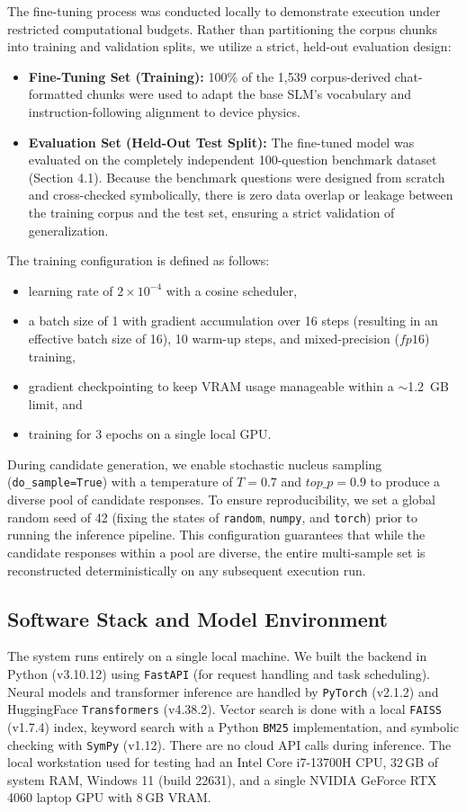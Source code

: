 \documentclass[a4paper,fleqn]{cas-sc}
\begin{document}
The fine-tuning process was conducted locally to demonstrate execution under restricted computational budgets. Rather than partitioning the corpus chunks into training and validation splits, we utilize a strict, held-out evaluation design:
\begin{itemize}
    \item \textbf{Fine-Tuning Set (Training):} 100\% of the 1,539 corpus-derived chat-formatted chunks were used to adapt the base SLM's vocabulary and instruction-following alignment to device physics.
    \item \textbf{Evaluation Set (Held-Out Test Split):} The fine-tuned model was evaluated on the completely independent 100-question benchmark dataset (Section 4.1). Because the benchmark questions were designed from scratch and cross-checked symbolically, there is zero data overlap or leakage between the training corpus and the test set, ensuring a strict validation of generalization.
\end{itemize}
The training configuration is defined as follows:
\begin{itemize}
    \item learning rate of $2 \times 10^{-4}$ with a cosine scheduler,
    \item a batch size of 1 with gradient accumulation over 16 steps (resulting in an effective batch size of 16), 10 warm-up steps, and mixed-precision ($fp16$) training,
    \item gradient checkpointing to keep VRAM usage manageable within a $\sim$1.2~GB limit, and
    \item training for 3 epochs on a single local GPU.
\end{itemize}
During candidate generation, we enable stochastic nucleus sampling (\texttt{do\_sample=True}) with a temperature of $T = 0.7$ and $top\_p = 0.9$ to produce a diverse pool of candidate responses. To ensure reproducibility, we set a global random seed of 42 (fixing the states of \texttt{random}, \texttt{numpy}, and \texttt{torch}) prior to running the inference pipeline. This configuration guarantees that while the candidate responses within a pool are diverse, the entire multi-sample set is reconstructed deterministically on any subsequent execution run.

\subsection{Software Stack and Model Environment}
The system runs entirely on a single local machine. We built the backend in Python (v3.10.12) using \texttt{FastAPI} (for request handling and task scheduling). Neural models and transformer inference are handled by \texttt{PyTorch} (v2.1.2) and HuggingFace \texttt{Transformers} (v4.38.2). Vector search is done with a local \texttt{FAISS} (v1.7.4) index, keyword search with a Python \texttt{BM25} implementation, and symbolic checking with \texttt{SymPy} (v1.12). There are no cloud API calls during inference. The local workstation used for testing had an Intel Core i7-13700H CPU, 32\,GB of system RAM, Windows 11 (build 22631), and a single NVIDIA GeForce RTX 4060 laptop GPU with 8\,GB VRAM.
\end{document}

